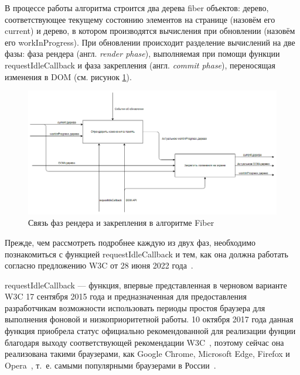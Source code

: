 В процессе работы алгоритма строится два дерева fiber объектов: дерево, соответствующее текущему состоянию элементов на странице (назовём его current) и дерево, в котором производятся вычисления при обновлении (назовём его workInProgress). 
При обновлении происходит разделение вычислений на две фазы: фаза рендера (англ. \textit{render phase}), выполняемая при  помощи функции requestIdleCallback и фаза закрепления (англ. \textit{commit phase}), переносящая изменения в DOM (см. рисунок \ref{fig:render-commit-phases}). 
\begin{figure}[h]
	\centering
	\captionsetup{justification=centering}
	\includegraphics[width=170mm]{img/render-commit-phases.png}
	\caption{Связь фаз рендера и закрепления в алгоритме Fiber}
	\label{fig:render-commit-phases}
\end{figure}

Прежде, чем рассмотреть подробнее каждую из двух фаз, необходимо познакомиться с функцией requestIdleCallback и тем, как она должна работать согласно предложению W3C от 28 июня 2022 года~\cite{requestidlecallback}.


requestIdleCallback --- функция, впервые представленная в черновом варианте~\cite{requestidlecallback-old} W3C 17 сентября 2015 года и предназначенная для предоставления разработчикам возможности использовать периоды простоя браузера для выполнения фоновой и низкоприоритетной работы. 
10 октября 2017 года данная функция приобрела статус официально рекомендованной для реализации фунции благодаря выходу соответствующей рекомендации W3C~\cite{requestidlecallback-recommended}, поэтому сейчас она реализована такими браузерами, как Google Chrome, Microsoft Edge, Firefox и Opera~\cite{requestidlecallback-mdn}, т.~е. самыми популярными браузерами в России~\cite{browser-popularity-russia}.

